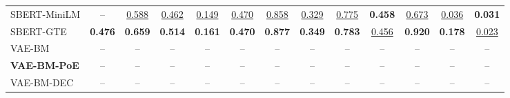 \begin{table}[t]
{\begin{tabular}{lcccccccccccc}
SBERT-MiniLM & -- & \underline{0.588} & \underline{0.462} & \underline{0.149} & \underline{0.470} & \underline{0.858} & \underline{0.329} & \underline{0.775} & \textbf{0.458} & \underline{0.673} & \underline{0.036} & \textbf{0.031} \\
SBERT-GTE & \textbf{0.476} & \textbf{0.659} & \textbf{0.514} & \textbf{0.161} & \textbf{0.470} & \textbf{0.877} & \textbf{0.349} & \textbf{0.783} & \underline{0.456} & \textbf{0.920} & \textbf{0.178} & \underline{0.023} \\
\midrule
VAE-BM & -- & -- & -- & -- & -- & -- & -- & -- & -- & -- & -- & -- \\
\textbf{VAE-BM-PoE} & -- & -- & -- & -- & -- & -- & -- & -- & -- & -- & -- & -- \\
VAE-BM-DEC & -- & -- & -- & -- & -- & -- & -- & -- & -- & -- & -- & -- \\
\bottomrule
\end{tabular}
}
\end{table}
